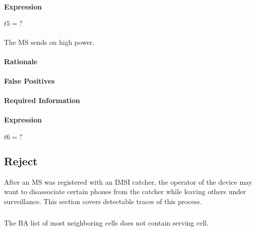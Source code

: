 \documentclass[a4paper,11pt,notitlepage,bigheadings,oneside]{scrartcl}
\begin{document}

\paragraph{Expression}

$t5 = ?$

\subsubsection{}

The MS sends on high power.

\paragraph{Rationale}


\paragraph{False Positives}


\paragraph{Required Information}


\paragraph{Expression}

$t6 = ?$

\subsection{Reject}

After an MS was registered with an IMSI catcher, the operator of the device may
want to disassociate certain phones from the catcher while leaving others under
surveillance. This section covers detectable traces of this process.

\subsubsection{}

The BA list of most neighboring cells does not contain serving cell.
\end{document}
